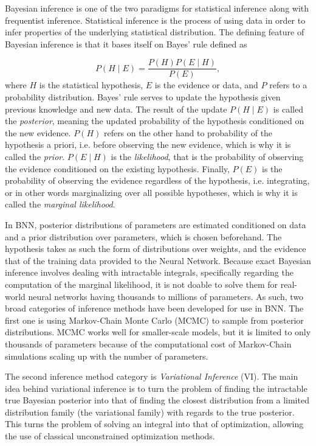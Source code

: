 	Bayesian inference is one of the two paradigms for statistical inference along with frequentist inference. Statistical inference is the process of using data in order to infer properties of the underlying statistical distribution. The defining feature of Bayesian inference is that it bases itself on Bayes' rule defined as 
	
	\begin{equation}
		P(H \mid E) = \frac{P(H)P(E\mid H)}{P(E)},
	\end{equation}
	where $H$ is the statistical hypothesis, $E$ is the evidence or data, and $P$ refers to a probability distribution. Bayes' rule serves to update the hypothesis given previous knowledge and new data. The result of the update $P(H\mid E)$ is called the \textit{posterior}, meaning the updated probability of the hypothesis conditioned on the new evidence. $P(H)$ refers on the other hand to probability of the hypothesis a priori, i.e. before observing the new evidence, which is why it is called the \textit{prior}. $P(E \mid H)$ is the \textit{likelihood}, that is the probability of observing the evidence conditioned on the existing hypothesis. Finally, $P(E)$ is the probability of observing the evidence regardless of the hypothesis, i.e. integrating, or in other words marginalizing over all possible hypotheses, which is why it is called the \textit{marginal likelihood}. 
	
	In BNN, posterior distributions of parameters are estimated conditioned on data and a prior distribution over parameters, which is chosen beforehand. The hypothesis takes as such the form of distributions over weights, and the evidence that of the training data provided to the Neural Network. Because exact Bayesian inference involves dealing with intractable integrals, specifically regarding the computation of the marginal likelihood, it is not doable to solve them for real-world neural networks having thousands to millions of parameters. As such, two broad categories of inference methods have been developed for use in BNN. The first one is using Markov-Chain Monte Carlo (MCMC) to sample from posterior distributions. MCMC works well for smaller-scale models, but it is limited to only thousands of parameters because of the computational cost of Markov-Chain simulations scaling up with the number of parameters.
	
	The second inference method category is \textit{Variational Inference} (VI). The main idea behind variational inference is to turn the problem of finding the intractable true Bayesian posterior into that of finding the closest distribution from a limited distribution family (the variational family) with regards to the true posterior. This turns the problem of solving an integral into that of optimization, allowing the use of classical unconstrained optimization methods. 
	
